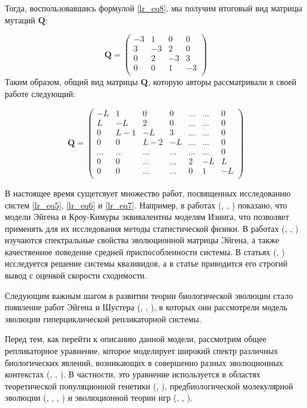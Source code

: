 Тогда, воспользовавшись формулой \eqref{lr_eq8}, мы получим итоговый вид матрицы мутаций $\mathbf{Q}$:

$$
\mathbf{Q} = 
\begin{pmatrix}
-3 & 1 & 0 & 0\\
 3 & -3 & 2 & 0\\
 0 & 2 & -3 & 3\\
 0 & 0 & 1  & -3\\
\end{pmatrix}
$$
Таким образом, общий вид матрицы $\mathbf{Q}$, которую авторы рассматривали в своей работе следующий:

$$
\mathbf{Q} = 
\begin{pmatrix}
-L  & 1     & 0      & 0   & ... & ... & 0\\
L   & -L    & 2      & 0   & ... & ... & 0\\
0   & L - 1 & -L     & 3   & ... & ... & 0\\
0   & 0     & L - 2  & -L  & ... & ... & 0\\
... & ...   & ...    & ... & ... & ... & 0\\
0   & 0     & ...    & ... & 2   & -L  & L\\
0   & 0     & ...    & ... & 0   & 1   & -L\\
\end{pmatrix}
$$

В настоящее время сущетсвует множество работ, посвященных исследованию систем \eqref{lr_eq5}, \eqref{lr_eq6} и \eqref{lr_eq7}. Например, в работах (\cite{Leuth1}, \cite{Leuth2}, \cite{Baake}) показано, что модели Эйгена и Кроу-Кимуры эквивалентны моделям Изинга, что позволяет применять для их исследования методы статистической физики. В работах (\cite{Rumschitzki}, \cite{Garcia}, \cite{Bratus1}) изучаются спектральные свойства эволюционной матрицы Эйгена, а также качественное поведение средней приспособленности системы. В статьях (\cite{Rumschitzki}, \cite{Galluccio}) исследуется решение системы квазивидов, а в статье \cite{Bratus2} приводится его строгий вывод с оценкой скорости сходимости.  

Следующим важным шагом в развитии теории биологической эволюции стало появление работ Эйгена и Шустера (\cite{Eig4}, \cite{Eig5}, \cite{Shuster2}), в которых они рассмотрели модель эволюции гиперциклической репликаторной системы.

Перед тем, как перейти к описанию данной модели, рассмотрим общее репликаторное уравнение, которое моделирует широкий спектр различных биологических явлений, возникающих в совершенно разных эволюционных контекстах (\cite{Hofbauer1}, \cite{Hofbauer2}, \cite{Shuster3}). В частности, это уравнение используется в областях теоретической популяционной генетики (\cite{Hofbauer1}, \cite{Svirezhev}), предбиологической молекулярной эволюции (\cite{Bratus3}, \cite{Bratus4}, \cite{Eig4}, \cite{Eig5}) и эволюционной теории игр (\cite{Hofbauer2}, \cite{Maynard}, \cite{Taylor}).

